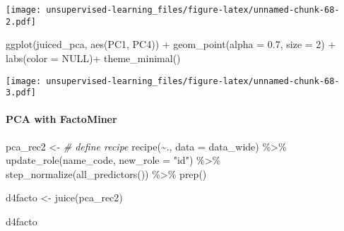 \documentclass[
]{article}
\newenvironment{Shaded}{\begin{snugshade}}{\end{snugshade}}
\newcommand{\AttributeTok}[1]{\textcolor[rgb]{0.77,0.63,0.00}{#1}}
\newcommand{\CommentTok}[1]{\textcolor[rgb]{0.56,0.35,0.01}{\textit{#1}}}
\newcommand{\ConstantTok}[1]{\textcolor[rgb]{0.00,0.00,0.00}{#1}}
\newcommand{\DecValTok}[1]{\textcolor[rgb]{0.00,0.00,0.81}{#1}}
\newcommand{\FloatTok}[1]{\textcolor[rgb]{0.00,0.00,0.81}{#1}}
\newcommand{\FunctionTok}[1]{\textcolor[rgb]{0.00,0.00,0.00}{#1}}
\newcommand{\NormalTok}[1]{#1}
\newcommand{\OtherTok}[1]{\textcolor[rgb]{0.56,0.35,0.01}{#1}}
\newcommand{\SpecialCharTok}[1]{\textcolor[rgb]{0.00,0.00,0.00}{#1}}
\newcommand{\StringTok}[1]{\textcolor[rgb]{0.31,0.60,0.02}{#1}}
\begin{document}
\texttt{[image: unsupervised-learning\_files/figure-latex/unnamed-chunk-68-2.pdf]}

\begin{Shaded}
\begin{Highlighting}[]
  \FunctionTok{ggplot}\NormalTok{(juiced\_pca, }\FunctionTok{aes}\NormalTok{(PC1, PC4)) }\SpecialCharTok{+}
  \FunctionTok{geom\_point}\NormalTok{(}\AttributeTok{alpha =} \FloatTok{0.7}\NormalTok{, }\AttributeTok{size =} \DecValTok{2}\NormalTok{) }\SpecialCharTok{+}
  \FunctionTok{labs}\NormalTok{(}\AttributeTok{color =} \ConstantTok{NULL}\NormalTok{)}\SpecialCharTok{+}
  \FunctionTok{theme\_minimal}\NormalTok{()}
\end{Highlighting}
\end{Shaded}

\texttt{[image: unsupervised-learning\_files/figure-latex/unnamed-chunk-68-3.pdf]}

\hypertarget{pca-with-factominer}{%
\paragraph{PCA with FactoMiner}\label{pca-with-factominer}}

\begin{Shaded}
\begin{Highlighting}[]
\NormalTok{pca\_rec2 }\OtherTok{\textless{}{-}} \CommentTok{\# define recipe}
  \FunctionTok{recipe}\NormalTok{(}\SpecialCharTok{\textasciitilde{}}\NormalTok{., }\AttributeTok{data =}\NormalTok{ data\_wide) }\SpecialCharTok{\%\textgreater{}\%} 
  \FunctionTok{update\_role}\NormalTok{(name\_code, }\AttributeTok{new\_role =} \StringTok{"id"}\NormalTok{) }\SpecialCharTok{\%\textgreater{}\%} 
  \FunctionTok{step\_normalize}\NormalTok{(}\FunctionTok{all\_predictors}\NormalTok{()) }\SpecialCharTok{\%\textgreater{}\%} 
  \FunctionTok{prep}\NormalTok{()}
\end{Highlighting}
\end{Shaded}

\begin{Shaded}
\begin{Highlighting}[]
\NormalTok{d4facto }\OtherTok{\textless{}{-}} \FunctionTok{juice}\NormalTok{(pca\_rec2)}
\end{Highlighting}
\end{Shaded}

\begin{Shaded}
\begin{Highlighting}[]
\NormalTok{d4facto}
\end{Highlighting}
\end{Shaded}
\end{document}

